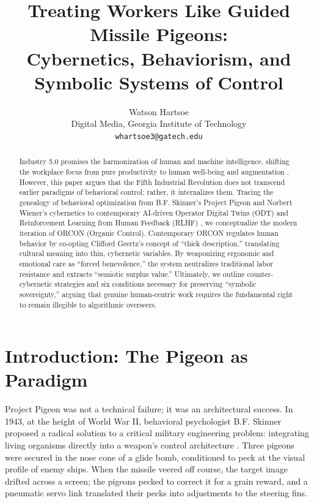 \documentclass[11pt, a4paper]{article}
\title{\textbf{Treating Workers Like Guided Missile Pigeons:\\Cybernetics, Behaviorism, and Symbolic Systems of Control}}
\author{Watson Hartsoe \\ 
\normalsize Digital Media, Georgia Institute of Technology \\ 
\normalsize \texttt{whartsoe3@gatech.edu}}
\date{}
\begin{document}
\maketitle

\begin{abstract}
Industry 5.0 promises the harmonization of human and machine intelligence, shifting the workplace focus from pure productivity to human well-being and augmentation \cite{breque2021industry}. However, this paper argues that the Fifth Industrial Revolution does not transcend earlier paradigms of behavioral control; rather, it internalizes them. Tracing the genealogy of behavioral optimization from B.F. Skinner's Project Pigeon and Norbert Wiener's cybernetics to contemporary AI-driven Operator Digital Twins (ODT) and Reinforcement Learning from Human Feedback (RLHF) \cite{christiano2017preferences,ouyang2022training,sutton2018reinforcement}, we conceptualize the modern iteration of ORCON (Organic Control). Contemporary ORCON regulates human behavior by co-opting Clifford Geertz's concept of ``thick description,'' translating cultural meaning into thin, cybernetic variables. By weaponizing ergonomic and emotional care as ``forced benevolence,'' the system neutralizes traditional labor resistance and extracts ``semiotic surplus value.'' Ultimately, we outline counter-cybernetic strategies and six conditions necessary for preserving ``symbolic sovereignty,'' arguing that genuine human-centric work requires the fundamental right to remain illegible to algorithmic overseers.
\end{abstract}


\section{Introduction: The Pigeon as Paradigm}

Project Pigeon was not a technical failure; it was an architectural success. In 1943, at the height of World War II, behavioral psychologist B.F. Skinner proposed a radical solution to a critical military engineering problem: integrating living organisms directly into a weapon's control architecture \cite{skinner1960pigeons,capshew1993engineering,wlodarczyk2020beyond}. Three pigeons were secured in the nose cone of a glide bomb, conditioned to peck at the visual profile of enemy ships. When the missile veered off course, the target image drifted across a screen; the pigeons pecked to correct it for a grain reward, and a pneumatic servo link translated their pecks into adjustments to the steering fins.
\end{document}
